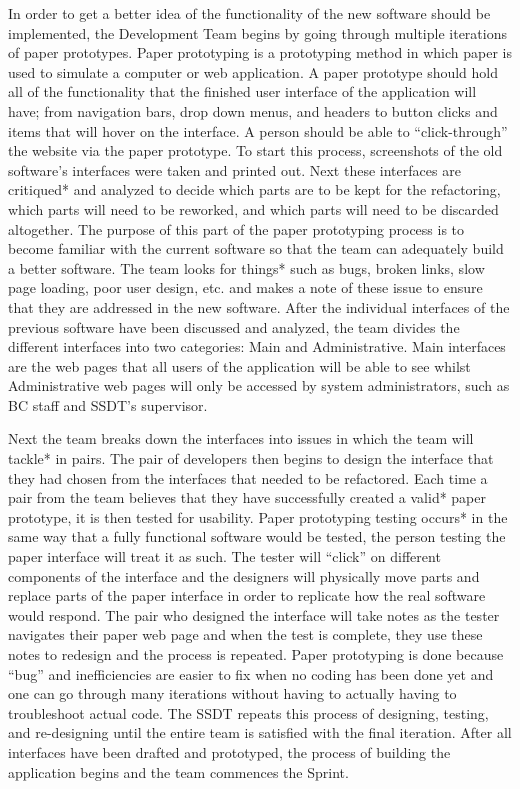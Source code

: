 In order to get a better idea of the functionality of the new software should be implemented, the Development Team begins by going through multiple iterations of paper prototypes. Paper prototyping is a prototyping method in which paper is used to simulate a computer or web application. A paper prototype should hold all of the functionality that the finished user interface of the application will have; from navigation bars, drop down menus, and headers to button clicks and items that will hover on the interface. A person should be able to ``click-through'' the website via the paper prototype. To start this process, screenshots of the old software's interfaces were taken and printed out. Next these interfaces are critiqued* and analyzed to decide which parts are to be kept for the refactoring, which parts will need to be reworked, and which parts will need to be discarded altogether. The purpose of this part of the paper prototyping process is to become familiar with the current software so that the team can adequately build a better software. The team looks for things* such as bugs, broken links, slow page loading, poor user design, etc. and makes a note of these issue to ensure that they are addressed in the new software. After the individual interfaces of the previous software have been discussed and analyzed, the team divides the different interfaces into two categories: Main and Administrative. Main interfaces are the web pages that all users of the application will be able to see whilst Administrative web pages will only be accessed by system administrators, such as BC staff and SSDT's supervisor.

Next the team breaks down the interfaces into issues in which the team will tackle* in pairs. The pair of developers then begins to design the interface that they had chosen from the interfaces that needed to be refactored. Each time a pair from the team believes that they have successfully created a valid* paper prototype, it is then tested for usability. Paper prototyping testing occurs* in  the same way that a fully functional software would be tested, the person testing the paper interface will treat it as such. The tester will ``click'' on different components of the interface and the designers will physically move parts and replace parts of the paper interface in order to replicate how the real software would respond. The pair who designed the interface will take notes as the tester navigates their paper web page and when the test is complete, they use these notes to redesign and the process is repeated. Paper prototyping is done because ``bug'' and inefficiencies are easier to fix when no coding has been done yet and one can go through many iterations without having to actually having to troubleshoot actual code. The SSDT repeats this process of designing, testing, and re-designing until the entire team is satisfied with the final iteration. After all interfaces have been drafted and prototyped, the process of building the application begins and the team commences the Sprint.

